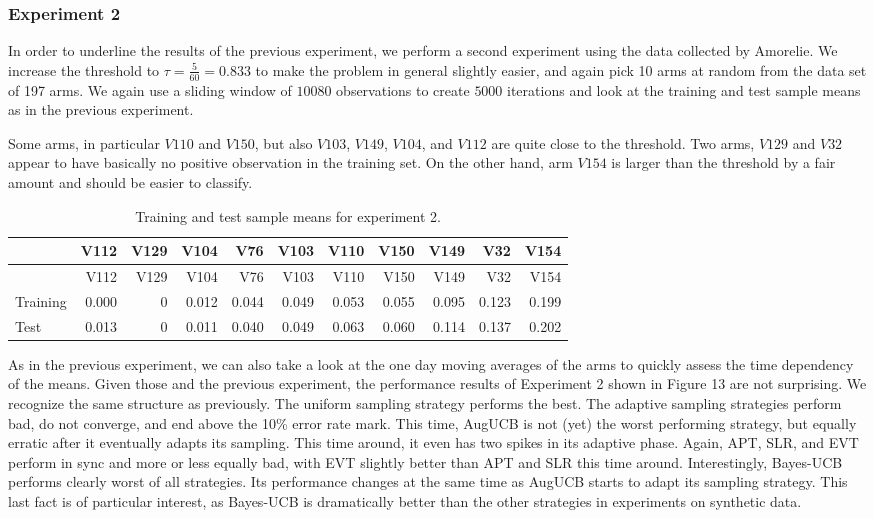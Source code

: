 \documentclass[11pt,]{article}
\begin{document}
\subsubsection{Experiment 2}\label{experiment-2}

In order to underline the results of the previous experiment, we perform
a second experiment using the data collected by Amorelie. We increase
the threshold to \(\tau = \frac{5}{60} = 0.833\) to make the problem in
general slightly easier, and again pick 10 arms at random from the data
set of 197 arms. We again use a sliding window of \(10080\) observations
to create \(5000\) iterations and look at the training and test sample
means as in the previous experiment.

Some arms, in particular \(V110\) and \(V150\), but also \(V103\),
\(V149\), \(V104\), and \(V112\) are quite close to the threshold. Two
arms, \(V129\) and \(V32\) appear to have basically no positive
observation in the training set. On the other hand, arm \(V154\) is
larger than the threshold by a fair amount and should be easier to
classify.

\begin{longtable}[]{@{}lrrrrrrrrrr@{}}
\caption{Training and test sample means for experiment
2.}\tabularnewline
\toprule
& V112 & V129 & V104 & V76 & V103 & V110 & V150 & V149 & V32 &
V154\tabularnewline
\midrule
\endfirsthead
\toprule
& V112 & V129 & V104 & V76 & V103 & V110 & V150 & V149 & V32 &
V154\tabularnewline
\midrule
\endhead
Training & 0.000 & 0 & 0.012 & 0.044 & 0.049 & 0.053 & 0.055 & 0.095 &
0.123 & 0.199\tabularnewline
Test & 0.013 & 0 & 0.011 & 0.040 & 0.049 & 0.063 & 0.060 & 0.114 & 0.137
& 0.202\tabularnewline
\bottomrule
\end{longtable}

As in the previous experiment, we can also take a look at the one day
moving averages of the arms to quickly assess the time dependency of the
means. Given those and the previous experiment, the performance results
of Experiment 2 shown in Figure 13 are not surprising. We recognize the
same structure as previously. The uniform sampling strategy performs the
best. The adaptive sampling strategies perform bad, do not converge, and
end above the 10\% error rate mark. This time, AugUCB is not (yet) the
worst performing strategy, but equally erratic after it eventually
adapts its sampling. This time around, it even has two spikes in its
adaptive phase. Again, APT, SLR, and EVT perform in sync and more or
less equally bad, with EVT slightly better than APT and SLR this time
around. Interestingly, Bayes-UCB performs clearly worst of all
strategies. Its performance changes at the same time as AugUCB starts to
adapt its sampling strategy. This last fact is of particular interest,
as Bayes-UCB is dramatically better than the other strategies in
experiments on synthetic data.
\end{document}
